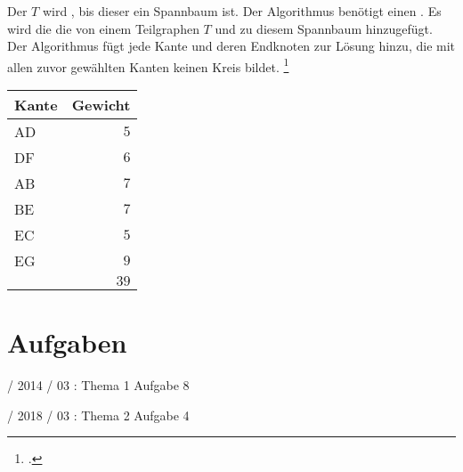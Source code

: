 \documentclass{lehramt-informatik-haupt}
\begin{document}
Der  $T$ wird , bis
dieser ein Spannbaum ist. Der Algorithmus benötigt einen
. Es wird die die  von
einem Teilgraphen $T$  und zu diesem
Spannbaum hinzugefügt. Der Algorithmus fügt jede Kante und deren
Endknoten zur Lösung hinzu, die mit allen zuvor gewählten Kanten keinen
Kreis bildet.
\footcite[Seite 32, (PDF 26)]{aud:fs:6}

\begin{minipage}{7cm}
\end{minipage}
\begin{minipage}{4cm}
\begin{center}
\begin{tabular}{|l|r|}
\hline
Kante & Gewicht\\\hline\hline
AD & $5$\\
DF & $6$\\
AB & $7$\\
BE & $7$\\
EC & $5$\\
EG & $9$\\\hline
   & $39$\\\hline
\end{tabular}
\end{center}
\end{minipage}


\chapter{Aufgaben}

 / 2014 / 03 : Thema 1 Aufgabe 8

%

 / 2018 / 03 : Thema 2 Aufgabe 4

%
\end{document}
